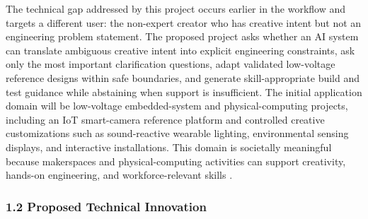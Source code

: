 The technical gap addressed by this project occurs earlier in the workflow and targets a different user: the non-expert creator who has creative intent but not an engineering problem statement. The proposed project asks whether an AI system can translate ambiguous creative intent into explicit engineering constraints, ask only the most important clarification questions, adapt validated low-voltage reference designs within safe boundaries, and generate skill-appropriate build and test guidance while abstaining when support is insufficient. The initial application domain will be low-voltage embedded-system and physical-computing projects, including an IoT smart-camera reference platform and controlled creative customizations such as sound-reactive wearable lighting, environmental sensing displays, and interactive installations. This domain is societally meaningful because makerspaces and physical-computing activities can support creativity, hands-on engineering, and workforce-relevant skills \cite{papagiannis2024makerspace,alvarez2024physicalcomputing,tadimalla2024ailiteracy,lodzikowski2024genaiimplications}.





\subsubsection*{1.2 Proposed Technical Innovation}


